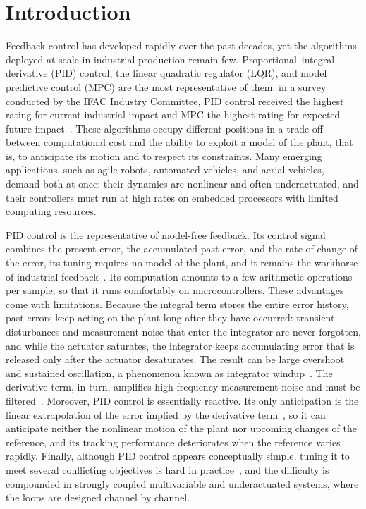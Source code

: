 \section{Introduction}\label{sec:introduction}


Feedback control has developed rapidly over the past decades, yet the algorithms deployed at
scale in industrial production remain few.
Proportional--integral--derivative (PID) control, the linear quadratic regulator (LQR), and
model predictive control (MPC) are the most representative of them: in a survey conducted by
the IFAC Industry Committee, PID control received the highest rating for current industrial
impact and MPC the highest rating for expected future impact~\citep{samad2020industry}.
These algorithms occupy different positions in a trade-off between computational cost and
the ability to exploit a model of the plant, that is, to anticipate its motion and to respect
its constraints.
Many emerging applications, such as agile robots, automated vehicles, and aerial vehicles,
demand both at once: their dynamics are nonlinear and often underactuated, and their
controllers must run at high rates on embedded processors with limited computing resources.

PID control is the representative of model-free feedback.
Its control signal combines the present error, the accumulated past error, and the rate of
change of the error, its tuning requires no model of the plant, and it remains the workhorse
of industrial feedback~\citep{astrom2001future}.
Its computation amounts to a few arithmetic operations per sample, so that it runs comfortably
on microcontrollers.
These advantages come with limitations.
Because the integral term stores the entire error history, past errors keep acting on the
plant long after they have occurred: transient disturbances and measurement noise that enter
the integrator are never forgotten, and while the actuator saturates, the integrator keeps
accumulating error that is released only after the actuator desaturates.
The result can be large overshoot and sustained oscillation, a phenomenon known as integrator
windup~\citep{astrom1989windup,astrom2008feedback}.
The derivative term, in turn, amplifies high-frequency measurement noise and must be
filtered~\citep{astrom2008feedback}.
Moreover, PID control is essentially reactive.
Its only anticipation is the linear extrapolation of the error implied by the derivative
term~\citep{astrom2008feedback}, so it can anticipate neither the nonlinear motion of the plant
nor upcoming changes of the reference, and its tracking performance deteriorates when the
reference varies rapidly.
Finally, although PID control appears conceptually simple, tuning it to meet several
conflicting objectives is hard in practice~\citep{ang2005pid}, and the difficulty is
compounded in strongly coupled multivariable and underactuated systems, where the loops are
designed channel by channel.

